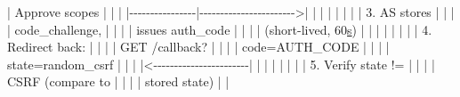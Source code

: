 \documentclass[11pt]{article}
\newenvironment{Shaded}{\begin{snugshade}}{\end{snugshade}}
\newcommand{\DecValTok}[1]{\textcolor[rgb]{0.96,0.45,0.00}{#1}}
\newcommand{\ErrorTok}[1]{\textcolor[rgb]{0.85,0.27,0.33}{\underline{#1}}}
\newcommand{\FloatTok}[1]{\textcolor[rgb]{0.96,0.45,0.00}{#1}}
\newcommand{\NormalTok}[1]{\textcolor[rgb]{0.81,0.81,0.76}{#1}}
\newcommand{\OperatorTok}[1]{\textcolor[rgb]{0.81,0.81,0.76}{#1}}
\begin{document}
\begin{Shaded}
\begin{Highlighting}[]
  \OperatorTok{|}\NormalTok{ Approve scopes }\OperatorTok{|}                        \OperatorTok{|}                          \OperatorTok{|}
  \OperatorTok{|{-}{-}{-}{-}{-}{-}{-}{-}{-}{-}{-}{-}{-}{-}{-}{-}|{-}{-}{-}{-}{-}{-}{-}{-}{-}{-}{-}{-}{-}{-}{-}{-}{-}{-}{-}{-}{-}{-}{-}\textgreater{}|}                          \OperatorTok{|}
  \OperatorTok{|}                \OperatorTok{|}                        \OperatorTok{|}                          \OperatorTok{|}
  \OperatorTok{|}                \OperatorTok{|} \FloatTok{3.}\NormalTok{ AS stores           }\OperatorTok{|}                          \OperatorTok{|}
  \OperatorTok{|}                \OperatorTok{|}\NormalTok{    code\_challenge,     }\OperatorTok{|}                          \OperatorTok{|}
  \OperatorTok{|}                \OperatorTok{|}\NormalTok{    issues auth\_code    }\OperatorTok{|}                          \OperatorTok{|}
  \OperatorTok{|}                \OperatorTok{|}\NormalTok{    (short}\OperatorTok{{-}}\NormalTok{lived, }\DecValTok{60}\ErrorTok{s}\NormalTok{)  }\OperatorTok{|}                          \OperatorTok{|}
  \OperatorTok{|}                \OperatorTok{|}                        \OperatorTok{|}                          \OperatorTok{|}
  \OperatorTok{|}                \OperatorTok{|} \FloatTok{4.}\NormalTok{ Redirect back:      }\OperatorTok{|}                          \OperatorTok{|}
  \OperatorTok{|}                \OperatorTok{|}\NormalTok{    GET }\OperatorTok{/}\NormalTok{callback?      }\OperatorTok{|}                          \OperatorTok{|}
  \OperatorTok{|}                \OperatorTok{|}\NormalTok{    code}\OperatorTok{=}\NormalTok{AUTH\_CODE      }\OperatorTok{|}                          \OperatorTok{|}
  \OperatorTok{|}                \OperatorTok{|}\NormalTok{    state}\OperatorTok{=}\NormalTok{random\_csrf   }\OperatorTok{|}                          \OperatorTok{|}
  \OperatorTok{|}                \OperatorTok{|\textless{}{-}{-}{-}{-}{-}{-}{-}{-}{-}{-}{-}{-}{-}{-}{-}{-}{-}{-}{-}{-}{-}{-}{-}|}                          \OperatorTok{|}
  \OperatorTok{|}                \OperatorTok{|}                        \OperatorTok{|}                          \OperatorTok{|}
  \OperatorTok{|}                \OperatorTok{|} \FloatTok{5.}\NormalTok{ Verify state }\OperatorTok{!=}     \OperatorTok{|}                          \OperatorTok{|}
  \OperatorTok{|}                \OperatorTok{|}\NormalTok{    CSRF (compare to    }\OperatorTok{|}                          \OperatorTok{|}
  \OperatorTok{|}                \OperatorTok{|}\NormalTok{    stored state)       }\OperatorTok{|}                          \OperatorTok{|}

\end{Highlighting}
\end{Shaded}
\end{document}
